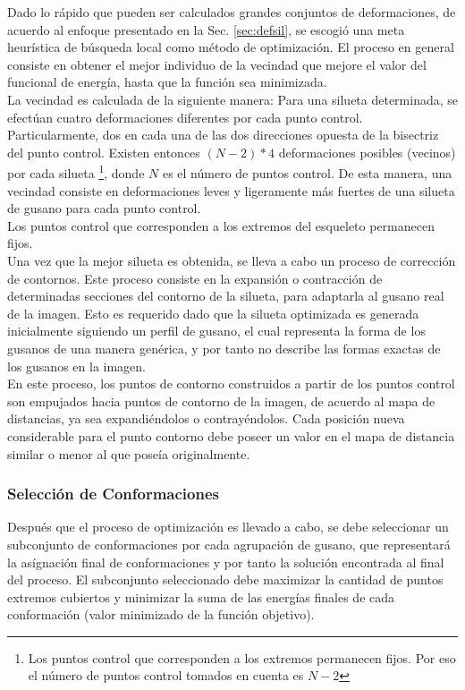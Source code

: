 Dado lo r\'apido que pueden ser calculados grandes conjuntos de deformaciones,
de acuerdo al enfoque presentado en la Sec. \ref{sec:defsil}, se escogi\'o
una meta heur\'istica de b\'usqueda local como m\'etodo de optimizaci\'on.
El proceso en general consiste en obtener el mejor individuo de la vecindad
que mejore el valor del funcional de energ\'ia, hasta que la funci\'on sea
minimizada.\\
La vecindad es calculada de la siguiente manera:
Para una silueta determinada, se efect\'uan cuatro deformaciones diferentes por cada punto
control. Particularmente, dos en cada una de las dos direcciones opuesta de la bisectriz
del punto control. Existen entonces $(N-2)*4$  
deformaciones posibles (vecinos) por cada silueta \footnote{Los puntos control que corresponden 
a los extremos permanecen fijos. Por eso el n\'umero de puntos control tomados en cuenta es $N-2$}, 
donde $N$ es el n\'umero de puntos control. De esta manera, una vecindad consiste en deformaciones
leves y ligeramente m\'as fuertes de una silueta de gusano para cada punto control.\\ 
Los puntos control que corresponden a los extremos del esqueleto permanecen fijos.\\

Una vez que la mejor silueta es obtenida, se lleva a cabo un proceso de correcci\'on
de contornos. Este proceso consiste en la expansi\'on o contracci\'on de determinadas 
secciones del contorno de la silueta, para adaptarla al gusano real de la imagen.
Esto es requerido dado que la silueta optimizada es generada inicialmente siguiendo un 
perfil de gusano, el cual representa la forma de los gusanos de una manera gen\'erica, y
por tanto no describe las formas exactas de los gusanos en la imagen.\\
En este proceso, los puntos de contorno construidos a partir de los puntos control son
empujados hacia puntos de contorno de la imagen, de acuerdo al mapa de distancias, ya
sea expandi\'endolos o contray\'endolos. Cada posici\'on nueva considerable para el punto
contorno debe poseer un valor en el mapa de distancia similar o menor al que pose\'ia
originalmente.

\subsubsection*{Selecci\'on de Conformaciones}

Despu\'es que el proceso de optimizaci\'on es llevado a cabo, se debe seleccionar
un subconjunto de conformaciones por cada agrupaci\'on de gusano, que representar\'a
la as\'ignaci\'on final de conformaciones y por tanto la soluci\'on encontrada al final
del proceso. El subconjunto seleccionado debe maximizar la cantidad
de puntos extremos cubiertos y minimizar la suma de las energ\'ias finales de
cada conformaci\'on (valor minimizado de la funci\'on objetivo).\\

